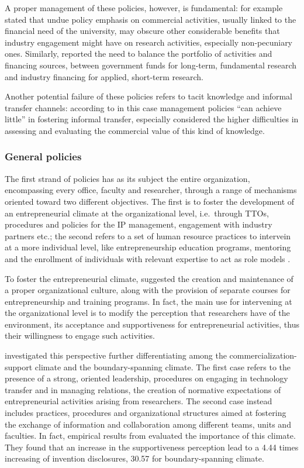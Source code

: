 A proper management of these policies, however, is fundamental: \citet{DEste2011} for example stated that undue policy emphasis on commercial activities, usually linked to the financial need of the university, may obscure other considerable benefits that industry engagement might have on research activities, especially non-pecuniary ones. Similarly, \citet{Debackere2005} reported the need to balance the portfolio of activities and financing sources, between government funds for long-term, fundamental research and industry financing for applied, short-term research. 

Another potential failure of these policies refers to tacit knowledge and informal transfer channels: according to \citet{Muscio2010} in this case management policies \enquote{can achieve little} in fostering informal transfer, especially considered the higher difficulties in assessing and evaluating the commercial value of this kind of knowledge. 

\subsubsection{General policies}

The first strand of policies has as its subject the entire organization, encompassing every office, faculty and researcher, through a range of mechanisms oriented toward two different objectives. The first is to foster the development of an entrepreneurial climate at the organizational level, i.e.\ through TTOs, procedures and policies for the IP management, engagement with industry partners etc.; the second refers to a set of human resource practices to intervein at a more individual level, like entrepreneurship education programs, mentoring and the enrollment of individuals with relevant expertise to act as role models \citep{Guerrero2014}. 

To foster the entrepreneurial climate, \citet{Klofsten2000} suggested the creation and maintenance of a proper organizational culture, along with the provision of separate courses for entrepreneurship and training programs. In fact, the main use for intervening at the organizational level is to modify the perception that researchers have of the environment, its acceptance and supportiveness for entrepreneurial activities, thus their willingness to engage such activities.

\citet{Hunter2011} investigated this perspective further differentiating among the commercialization-support climate and the boundary-spanning climate. The first case refers to the presence of a strong, oriented leadership, procedures on engaging in technology transfer and in managing relations, the creation of normative expectations of entrepreneurial activities arising from researchers. The second case instead includes practices, procedures and organizational structures aimed at fostering the exchange of information and collaboration among different teams, units and faculties. In fact, empirical results from \citet{Hunter2011} evaluated the importance of this climate. They found that an increase in the supportiveness perception lead to a 4.44 times increasing of invention disclosures, 30.57 for boundary-spanning climate. 

